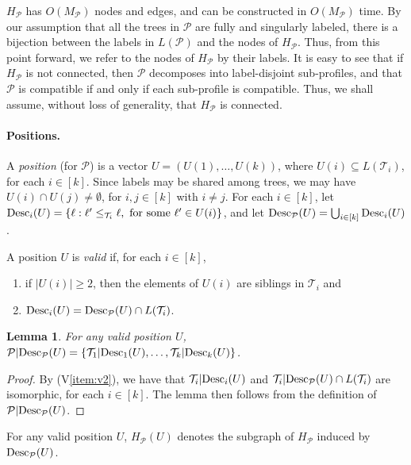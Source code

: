 \documentclass[11pt]{article}
\newcommand{\MP}{\ensuremath{M_\P}} \newcommand{\TG}{\ensuremath{\Gamma}} \newcommand{\incompatible}{\texttt{incompatible}}
\newcommand{\DG}{\ensuremath{H_\P}} \newcommand{\GBNT}{\ensuremath{G_{\mathtt{BNT}}}}
\renewcommand{\P}{\ensuremath{\mathcal{P}}}
\newcommand{\T}{\ensuremath{\mathcal{T}}}
\newtheorem{lemma}{Lemma}
\theoremstyle{definition}
\begin{document}
$\DG$ has $O(\MP)$ nodes and edges, and can be constructed in $O(\MP)$ time.  By our assumption that all the trees in $\P$ are fully and singularly labeled,
there is a bijection between the labels in $L(\P)$ and the nodes of $\DG$.  Thus, from this point forward, we refer to the nodes of $\DG$ by their labels.
It is easy to see that if $\DG$ is not connected, then $\P$ decomposes into label-disjoint sub-profiles, and that $\P$ is compatible if and only if each sub-profile is compatible.  Thus, we shall assume, without loss of generality, that $\DG$ is connected. 

\vspace{-1.5\parsep}

\paragraph{Positions.} A \emph{position} (for $\P$) is a vector $U = (U(1), \dots, U(k))$, where $U(i) \subseteq L(\T_i)$, for each $i \in [k]$.  Since labels may be shared among trees, we may have $U(i) \cap U(j) \neq \emptyset$, for $i, j \in [k]$ with $i \neq j$.   
For each $i \in [k]$, let $\Desc_i(U) = \{\ell : \ell' \le_{\T_i} \ell, \text{ for some } \ell'  \in U(i)\}$, and let $\Desc_\P(U) = \bigcup_{i \in [k]} \Desc_i(U)$.  


A position $U$ is \emph{valid} if, for each $i \in [k]$, 
\vspace{-0.1cm}
\begin{enumerate}[(V1)]
\vspace{-0.5\parskip}
 \itemsep1pt \parskip0pt 
\item\label{item:v1}
if $|U(i)| \ge 2$, then the elements of $U(i)$ are siblings in $\T_i$ and
\item\label{item:v2}
$\Desc_i(U) = \Desc_\P(U) \cap L(\T_i)$.
\end{enumerate}
\vspace{-1\parsep}

\begin{lemma}\label{lem:V2}
For any valid position $U$, $\P | \Desc_\P(U) = \{\T_1|\Desc_1(U), \dots, \T_k|\Desc_k(U)\}$.
\end{lemma}
\begin{proof}
By (V\ref{item:v2}), we have that $\T_i|\Desc_i(U)$ and $\T_i| \Desc_\P(U) \cap L(\T_i)$ are isomorphic, for each $i \in [k]$. The lemma then follows from the definition of $\P | \Desc_\P(U)$.
\end{proof}

For any valid position $U$, $\DG(U)$ denotes the subgraph of $\DG$ induced by $\Desc_\P(U)$.
\end{document}
